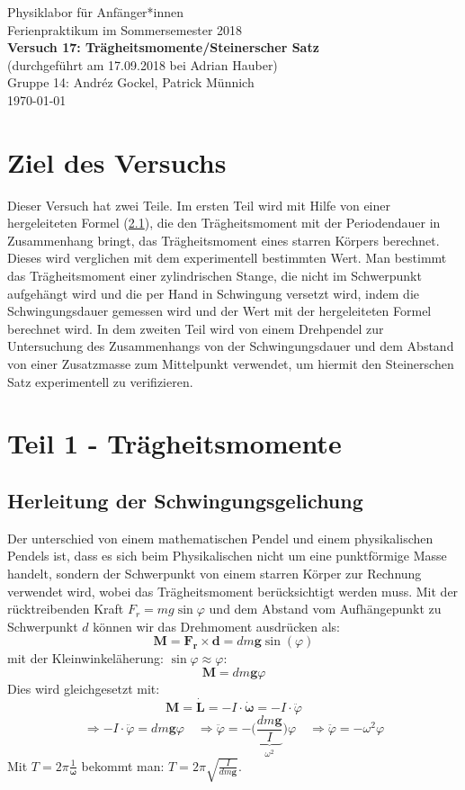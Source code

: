 \documentclass[11pt,a4paper]{article}
\renewcommand{\vec}{\boldsymbol}
\begin{document}
{
\centering 
\large 
Physiklabor für Anf\"anger*innen \\
Ferienpraktikum im Sommersemester 2018 \\[4mm]
\textbf{\LARGE 
Versuch 17: Trägheitsmomente/Steinerscher Satz
} \\[3mm]
(durchgef\"uhrt am 17.09.2018 bei Adrian Hauber)\\
Gruppe 14: Andréz Gockel, Patrick M\"unnich\\ 
\today \\[10mm]
}

\tableofcontents
\vspace{22pt}
\listoffigures
\vspace{22pt}
\listoftables
\pagebreak



\section{Ziel des Versuchs}

Dieser Versuch hat zwei Teile. Im ersten Teil wird mit Hilfe von einer hergeleiteten Formel (\ref{}), die den Trägheitsmoment mit der Periodendauer in Zusammenhang bringt, das Trägheitsmoment eines starren Körpers berechnet. Dieses wird verglichen mit dem experimentell bestimmten Wert. Man bestimmt das Trägheitsmoment einer zylindrischen Stange, die nicht im Schwerpunkt aufgehängt wird und die per Hand in Schwingung versetzt wird, indem die Schwingungsdauer gemessen wird und der Wert mit der hergeleiteten Formel berechnet wird. In dem zweiten Teil wird von einem Drehpendel zur Untersuchung des Zusammenhangs von der Schwingungsdauer und dem Abstand von einer Zusatzmasse zum Mittelpunkt verwendet, um hiermit den Steinerschen Satz experimentell zu verifizieren. 

\section{Teil 1 - Trägheitsmomente}
\subsection{Herleitung der Schwingungsgelichung}

Der unterschied von einem mathematischen Pendel und einem physikalischen Pendels ist, dass es sich beim Physikalischen nicht um eine punktförmige Masse handelt, sondern der Schwerpunkt von einem starren Körper zur Rechnung verwendet wird, wobei das Trägheitsmoment berücksichtigt werden muss. Mit der rücktreibenden Kraft $F_r = mg\sin\varphi$ und dem Abstand vom Aufhängepunkt zu Schwerpunkt $d$ können wir das Drehmoment ausdrücken als:
$$\vec{M} = \vec{F_r} \times \vec{d} = dm\vec{g}\sin(\varphi)$$
mit der Kleinwinkeläherung: $\sin\varphi \approx \varphi$:
$$\vec{M} = dm\vec{g}\varphi$$
Dies wird gleichgesetzt mit:
$$\vec{M} = \vec{\dot L} = - I \cdot \vec{\dot\omega} = - I \cdot \ddot \varphi$$
$$\Rightarrow - I \cdot \ddot \varphi = dm\vec{g}\varphi \quad \Rightarrow \ddot \varphi = - \bigg(\underbrace{\frac{dm\vec{g}}{I}}_{\omega^2}\bigg)\varphi \quad \Rightarrow \ddot \varphi = - \omega^2 \varphi$$
Mit $T = 2\pi \frac{1}{\vec{\omega}}$ bekommt man: $T = 2\pi \sqrt{\frac{I}{dm\vec{g}}}$.
\end{document}

